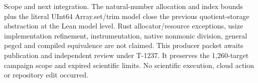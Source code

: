 \documentclass[10pt]{article}
\begin{document}
Scope and next integration. The natural-number allocation and index bounds plus the literal UInt64 Array.set/trim model close the previous quotient-storage abstraction at the Lean model level. Rust allocator/resource exceptions, usize implementation refinement, instrumentation, native nonmonic division, general pegcd and compiled equivalence are not claimed. This producer packet awaits publication and independent review under T-1237. It preserves the 1,260-target campaign scope and expired scientific limits. No scientific execution, cloud action or repository edit occurred.\par\medskip
\end{document}
